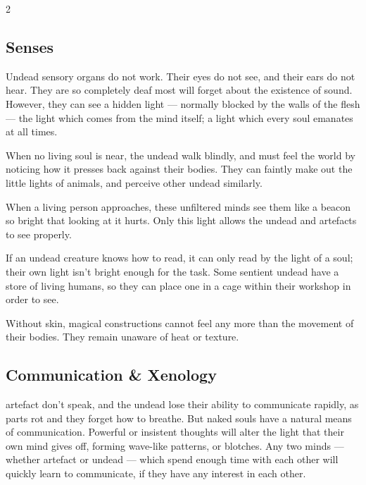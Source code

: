 \begin{multicols}{2}
\renewcommand\npcsymbol{\D}

\subsection[The undead are deaf and blind, but see by the light of living souls]{Senses}
\label{undead_senses}
\label{artefact_senses}

Undead sensory organs do not work.
Their eyes do not see, and their ears do not hear.
They are so completely deaf most will forget about the existence of sound.
However, they can see a hidden light --- normally blocked by the walls of the flesh --- the light which comes from the mind itself;
a light which every soul emanates at all times.

When no living soul is near, the undead walk blindly, and must feel the world by noticing how it presses back against their bodies.
They can faintly make out the little lights of animals, and perceive other undead similarly.

When a living person approaches, these unfiltered minds see them like a beacon so bright that looking at it hurts.
Only this light allows the undead and \glspl{artefact} to see properly.

If an undead creature knows how to read, it can only read by the light of a soul; their own light isn't bright enough for the task.
Some sentient undead have a store of living humans, so they can place one in a cage within their workshop in order to see.

Without skin, magical constructions cannot feel any more than the movement of their bodies.
They remain unaware of heat or texture.

\subsection{Communication \& Xenology}
\label{dead_communication}
\label{Xenology}

\Gls{artefact} don't speak, and the undead lose their ability to communicate rapidly, as parts rot and they forget how to breathe.
But naked souls have a natural means of communication.
Powerful or insistent thoughts will alter the light that their own mind gives off, forming wave-like patterns, or blotches.
Any two minds --- whether \gls{artefact} or undead --- which spend enough time with each other will quickly learn to communicate, if they have any interest in each other.


\end{multicols}
